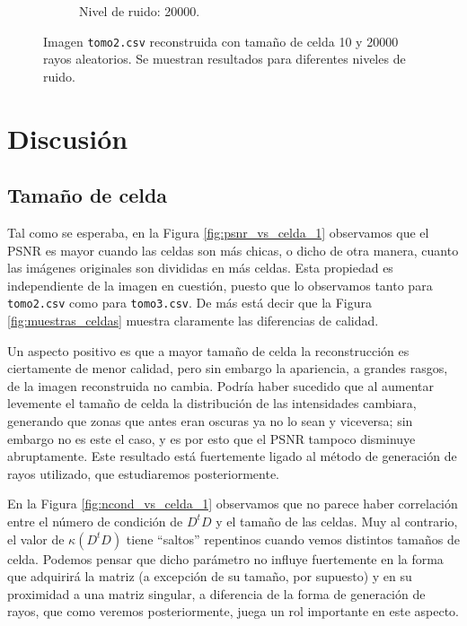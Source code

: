 \documentclass[a4paper]{article}
\begin{document}
\begin{figure}
\begin{subfigure}{0.4\linewidth}
  \caption{Nivel de ruido: 20000.}
\end{subfigure}
\caption{Imagen \texttt{tomo2.csv} reconstruida con tamaño de celda 10 y 20000 rayos aleatorios. Se 
muestran resultados para diferentes niveles de ruido.}
\label{fig:muestras_ruido}
\end{figure}


\clearpage

\section{Discusión}

\subsection{Tamaño de celda}

Tal como se esperaba, en la Figura \ref{fig:psnr_vs_celda_1} observamos que el PSNR es mayor cuando las celdas son más chicas, o dicho de otra 
manera, cuanto las imágenes originales son divididas en más celdas. Esta propiedad es independiente de la imagen en cuestión, puesto que lo 
observamos tanto para \texttt{tomo2.csv} como para \texttt{tomo3.csv}. De más está decir que la Figura \ref{fig:muestras_celdas} muestra claramente 
las diferencias de calidad.

Un aspecto positivo es que a mayor tamaño de celda la reconstrucción es ciertamente de menor calidad, pero sin embargo la apariencia, a grandes 
rasgos, de la imagen reconstruida no cambia. Podría haber sucedido que al aumentar levemente el tamaño de celda la distribución de las intensidades 
cambiara, generando que zonas que antes eran oscuras ya no lo sean y viceversa; sin embargo no es este el caso, y es por esto que el PSNR tampoco 
disminuye abruptamente. Este resultado está fuertemente ligado al método de generación de rayos utilizado, que estudiaremos posteriormente.

En la Figura \ref{fig:ncond_vs_celda_1} observamos que no parece haber correlación entre el número de condición de $D^tD$ y el tamaño de las celdas. 
Muy al contrario, el valor de $\kappa(D^tD)$ tiene ``saltos'' repentinos cuando vemos distintos tamaños de celda. Podemos pensar que dicho parámetro 
no influye fuertemente en la forma que adquirirá la matriz (a excepción de su tamaño, por supuesto) y en su proximidad a una matriz singular, 
a diferencia de la forma de generación de rayos, que como veremos posteriormente, juega un rol importante en este aspecto.
\end{document}
